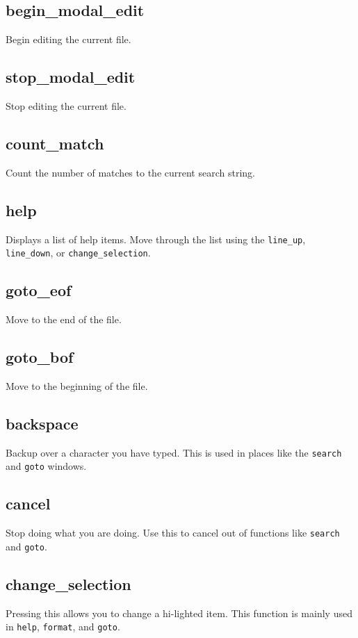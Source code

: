 \documentclass[12pt]{article}
\begin{document}
\subsection{begin\_modal\_edit}
Begin editing the current file.

\subsection{stop\_modal\_edit}
Stop editing the current file.

\subsection{count\_match}
Count the number of matches to the current search string.

\subsection{help}
Displays a list of help items.  Move through the list using the \verb#line_up#, 
\verb#line_down#, or \verb#change_selection#. 

\subsection{goto\_eof}
Move to the end of the file.

\subsection{goto\_bof}
Move to the beginning of the file.

\subsection{backspace}
Backup over a character you have typed.  This is used in places like the 
\verb#search# and \verb#goto# windows.

\subsection{cancel}
Stop doing what you are doing.  Use this to cancel out of functions like 
\verb#search# and \verb#goto#.

\subsection{change\_selection}
Pressing this allows you to change a hi-lighted item.  This function is mainly
used in \verb#help#, \verb#format#, and \verb#goto#.
\end{document}
